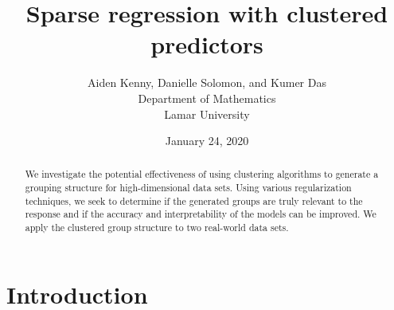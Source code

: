 \documentclass[11pt]{article}
\begin{document}

\title{Sparse regression with clustered predictors}
\author{Aiden Kenny, Danielle Solomon, and Kumer Das\\
Department of Mathematics\\
Lamar University}
\date{January 24, 2020}
\maketitle


\begin{abstract}



We investigate the potential effectiveness of using clustering algorithms to generate a grouping structure for high-dimensional data sets. Using various regularization techniques, we seek to determine if the generated groups are truly relevant to the response and if the accuracy and interpretability of the models can be improved. We apply the clustered group structure to two real-world data sets.

\end{abstract}

\section{Introduction}

\end{document}
